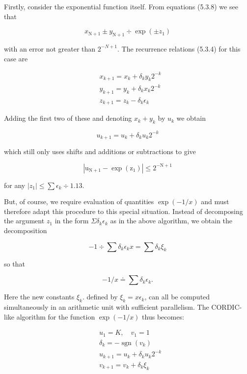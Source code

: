 \documentclass[10pt]{article}
\begin{document}
Firstly, consider the exponential function itself. From equations (5.3.8) we see that


\begin{equation*}
x_{\mathrm{N}+1} \pm y_{\mathrm{N}+1} \div \exp \left( \pm z_{1}\right) \tag{5.4.1}
\end{equation*}


with an error not greater than $2^{-N+1}$. The recurrence relations (5.3.4) for this case are

$$
\begin{aligned}
& x_{k+1}=x_{k}+\delta_{k} y_{k} 2^{-k} \\
& y_{k+1}=y_{k}+\delta_{k} x_{k} 2^{-k} \\
& z_{k+1}=z_{k}-\delta_{k} \epsilon_{k}
\end{aligned}
$$

Adding the first two of these and denoting $x_{k}+y_{k}$ by $u_{k}$ we obtain


\begin{equation*}
u_{k+1}=u_{k}+\delta_{k} u_{k} 2^{-k} \tag{5.4.2}
\end{equation*}


which still only uses shifts and additions or subtractions to give

$$
\left|\mathrm{u}_{\mathrm{N}+1}-\exp \left(\mathrm{z}_{1}\right)\right| \leqslant 2^{-\mathrm{N}+1}
$$

for any $\left|z_{1}\right| \leqslant \sum \epsilon_{k} \div 1.13$.

But, of course, we require evaluation of quantities $\exp (-1 / x)$ and must therefore adapt this procedure to this special situation. Instead of decomposing the argument $z_{1}$ in the form $\Sigma \delta_{k} \epsilon_{k}$ as in the above algorithm, we obtain the decomposition


\begin{equation*}
-1 \div \sum \delta_{k} \epsilon_{k} x=\sum \delta_{k} \xi_{k} \tag{5.4.3}
\end{equation*}


so that

$$
-1 / x \doteq \sum \delta_{k} \epsilon_{k} .
$$

Here the new constants $\xi_{k}$. defined by $\xi_{k}=x \epsilon_{k}$, can all be computed simultaneously in an arithmetic unit with sufficient parallelism. The CORDIC-like algorithm for the function $\exp (-1 / x)$ thus becomes:


\begin{align*}
& u_{1}=K, \quad v_{1}=1 \\
& \delta_{k}=-\operatorname{sgn}\left(v_{k}\right)  \tag{5.4.4}\\
& u_{k+1}=u_{k}+\delta_{k} u_{k} 2^{-k} \\
& v_{k+1}=v_{k}+\delta_{k} \xi_{k}
\end{align*}
\end{document}
